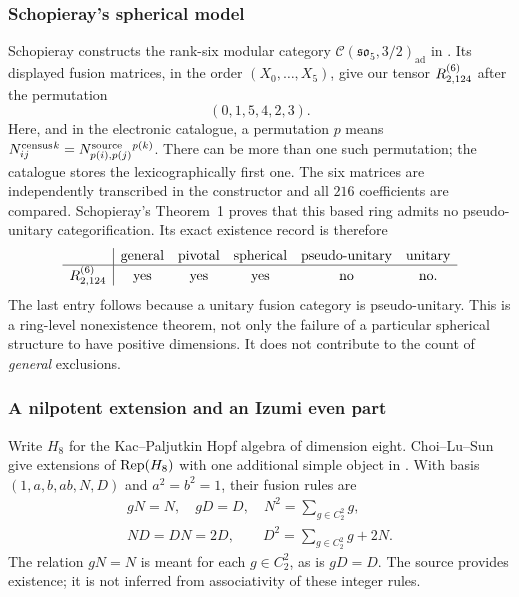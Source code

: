\subsubsection{Schopieray's spherical model}
Schopieray constructs the rank-six modular category
$\mathcal C(\mathfrak{so}_5,3/2)_{\mathrm{ad}}$ in
\cite[Example~1, equations~(1)--(2)]{SchNonPU}. Its displayed fusion
matrices, in the order $(X_0,\ldots,X_5)$, give our tensor $R^{(6)}_{2,124}$
after the permutation
\[
 (0,1,5,4,2,3).
\]
Here, and in the electronic catalogue, a permutation $p$ means
$N^{\rm census}_{ij}{}^k=N^{\rm source}_{p(i),p(j)}{}^{p(k)}$.
There can be more than one such permutation; the catalogue stores the
lexicographically first one. The six matrices are independently
transcribed in the constructor and all $216$ coefficients are compared.
Schopieray's Theorem~1 proves that this based ring admits no
pseudo-unitary categorification. Its exact existence record is therefore
\[
\begin{array}{c|ccccc}
 &\text{general}&\text{pivotal}&\text{spherical}&\text{pseudo-unitary}&\text{unitary}\\\hline
R^{(6)}_{2,124}&\text{yes}&\text{yes}&\text{yes}&\text{no}&\text{no}.
\end{array}
\]
The last entry follows because a unitary fusion category is
pseudo-unitary. This is a ring-level nonexistence theorem, not only the
failure of a particular spherical structure to have positive dimensions.
It does not contribute to the count of \emph{general} exclusions.

\subsubsection{A nilpotent extension and an Izumi even part}
Write $H_8$ for the Kac--Paljutkin Hopf algebra of dimension eight.
Choi--Lu--Sun give extensions of $\operatorname{Rep}(H_8)$ with one additional simple
object in \cite[equation~(1.4), Section~7.1 and Tables~3--4]{CLS}.
With basis $(1,a,b,ab,N,D)$ and $a^2=b^2=1$, their fusion rules are
\begin{equation}\label{eq:h8-extension}
 \begin{gathered}
 gN=N,\quad gD=D,\quad N^2=\sum_{g\in C_2^2}g,\\
 ND=DN=2D,\qquad D^2=\sum_{g\in C_2^2}g+2N.
 \end{gathered}
\end{equation}
The relation $gN=N$ is meant for each $g\in C_2^2$, as is $gD=D$.
The source provides existence; it is not inferred from associativity of
these integer rules.


